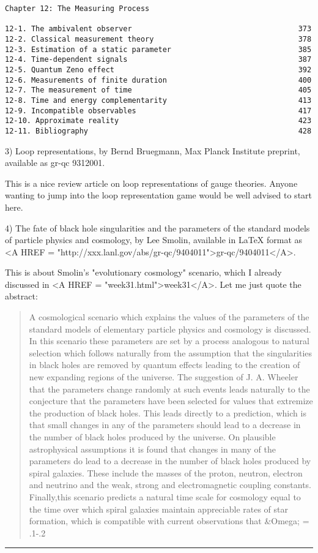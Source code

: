 \begin{verbatim}
Chapter 12: The Measuring Process  
 
12-1. The ambivalent observer                                      373 
12-2. Classical measurement theory                                 378 
12-3. Estimation of a static parameter                             385 
12-4. Time-dependent signals                                       387 
12-5. Quantum Zeno effect                                          392 
12-6. Measurements of finite duration                              400 
12-7. The measurement of time                                      405 
12-8. Time and energy complementarity                              413 
12-9. Incompatible observables                                     417 
12-10. Approximate reality                                         423 
12-11. Bibliography                                                428
\end{verbatim}
    

3) Loop representations, by Bernd Bruegmann, Max Planck Institute
preprint, available as gr-qc 9312001.  

This is a nice review article on loop representations of gauge theories.
Anyone wanting to jump into the loop representation game would be well
advised to start here.

4) The fate of black hole singularities and the parameters of the standard
models of particle physics and cosmology, by Lee Smolin, available in
LaTeX format as <A HREF = "http://xxx.lanl.gov/abs/gr-qc/9404011">gr-qc/9404011</A>.  

This is about Smolin's "evolutionary cosmology" scenario, which I
already discussed in <A HREF = "week31.html">week31</A>.  Let me just quote the abstract:

\begin{quote}
A cosmological scenario which explains the values of the parameters of the
standard models of elementary particle physics and cosmology is discussed.
In this scenario these parameters are set by a process analogous to natural
selection which follows naturally from the assumption that the singularities
in black holes are removed by quantum effects leading to the creation of new
expanding regions of the universe.  The suggestion of J. A. Wheeler that the
parameters change randomly at such events leads naturally to the conjecture
that the parameters have been selected for values that extremize the
production of black holes. This leads directly to a prediction, which is that
small changes in any of the parameters should lead to a decrease in the number
of black holes produced by the universe.  On plausible astrophysical
assumptions it is found that changes in many of the parameters do lead to a
decrease in the number of black holes produced by spiral galaxies. These
include the masses of the proton, neutron, electron and neutrino and the weak,
strong and electromagnetic coupling constants. Finally,this scenario predicts
a natural time scale for cosmology equal to the time over which spiral
galaxies maintain appreciable rates of star formation, which is compatible
with current observations that &Omega; = .1-.2  
\end{quote}
    



\par\noindent\rule{\textwidth}{0.4pt}


